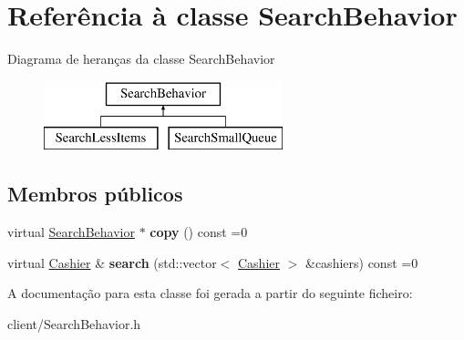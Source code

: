 \hypertarget{classSearchBehavior}{\section{Referência à classe Search\-Behavior}
\label{de/d9c/classSearchBehavior}
}
Diagrama de heranças da classe Search\-Behavior\begin{figure}[H]
\begin{center}
\leavevmode
\includegraphics[height=2.000000cm]{de/d9c/classSearchBehavior}
\end{center}
\end{figure}
\subsection*{Membros públicos}
\begin{DoxyCompactItemize}
\item 
\hypertarget{classSearchBehavior_a66f39c53cb1cb9dc029c6fdae55c6234}{virtual \hyperlink{classSearchBehavior}{Search\-Behavior} $\ast$ {\bfseries copy} () const =0}\label{de/d9c/classSearchBehavior_a66f39c53cb1cb9dc029c6fdae55c6234}

\item 
\hypertarget{classSearchBehavior_a2347f04c014b7ad8ff9969b2cff6b126}{virtual \hyperlink{classCashier}{Cashier} \& {\bfseries search} (std\-::vector$<$ \hyperlink{classCashier}{Cashier} $>$ \&cashiers) const =0}\label{de/d9c/classSearchBehavior_a2347f04c014b7ad8ff9969b2cff6b126}

\end{DoxyCompactItemize}


A documentação para esta classe foi gerada a partir do seguinte ficheiro\-:\begin{DoxyCompactItemize}
\item 
client/Search\-Behavior.\-h\end{DoxyCompactItemize}
